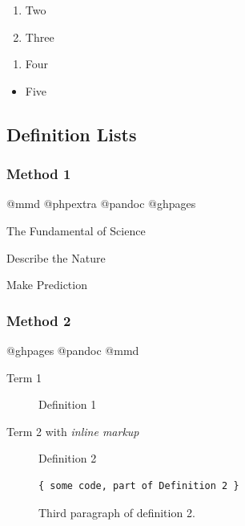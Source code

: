 \documentclass[]{article}
\providecommand{\tightlist}{%
  \setlength{\itemsep}{0pt}\setlength{\parskip}{0pt}}
\begin{document}
\begin{enumerate}
\def\labelenumi{(\arabic{enumi})}
\setcounter{enumi}{1}
\tightlist
\item
  Two
\item
  Three
\end{enumerate}

\begin{enumerate}
\def\labelenumi{\arabic{enumi}.}
\tightlist
\item
  Four
\end{enumerate}

\begin{itemize}
\tightlist
\item
  Five
\end{itemize}

\subsection{Definition Lists}\label{definition-lists}

\subsubsection{Method 1}\label{method-1}

@mmd @phpextra @pandoc @ghpages

\begin{description}
\tightlist
\item[Physics]
The Fundamental of Science

Describe the Nature

Make Prediction
\end{description}

\subsubsection{Method 2}\label{method-2}

@ghpages @pandoc @mmd

\begin{description}
\item[Term 1]
Definition 1
\item[Term 2 with \emph{inline markup}]
Definition 2

\begin{verbatim}
{ some code, part of Definition 2 }
\end{verbatim}

Third paragraph of definition 2.
\end{description}
\end{document}
